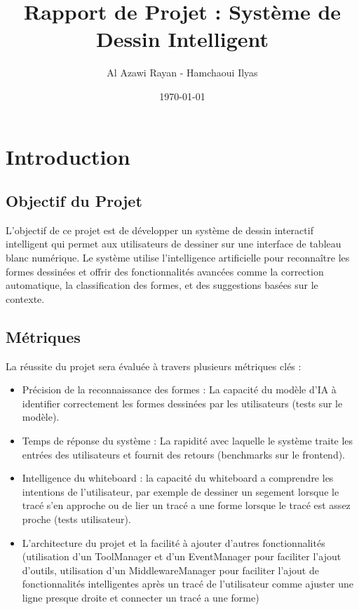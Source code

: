 \documentclass[12pt]{article}
\title{Rapport de Projet : Système de Dessin Intelligent}
\author{Al Azawi Rayan - Hamchaoui Ilyas}
\date{\today}
\begin{document}
\maketitle


\section{Introduction}

\subsection{Objectif du Projet}

L'objectif de ce projet est de développer un système de dessin interactif intelligent qui permet aux utilisateurs de dessiner sur une interface de tableau blanc numérique. Le système utilise l'intelligence artificielle pour reconnaître les formes dessinées et offrir des fonctionnalités avancées comme la correction automatique, la classification des formes, et des suggestions basées sur le contexte.

\subsection{Métriques}

La réussite du projet sera évaluée à travers plusieurs métriques clés :
\begin{itemize}
  \setlength\itemsep{1em}
  \item Précision de la reconnaissance des formes : La capacité du modèle d'IA à identifier correctement les formes dessinées par les utilisateurs (tests sur le modèle).
  \item Temps de réponse du système : La rapidité avec laquelle le système traite les entrées des utilisateurs et fournit des retours (benchmarks sur le frontend).
  \item Intelligence du whiteboard : la capacité du whiteboard a comprendre les intentions de l'utilisateur, par exemple de dessiner un segement lorsque le tracé s'en approche ou de lier un tracé a une forme lorsque le tracé est assez proche (tests utilisateur).
  \item L'architecture du projet et la facilité à ajouter d'autres fonctionnalités (utilisation d'un ToolManager et d'un EventManager pour faciliter l'ajout d'outils, utilisation d'un MiddlewareManager pour faciliter l'ajout de fonctionnalités intelligentes après un tracé de l'utilisateur comme ajuster une ligne presque droite et connecter un tracé a une forme)
\end{itemize}
\end{document}
